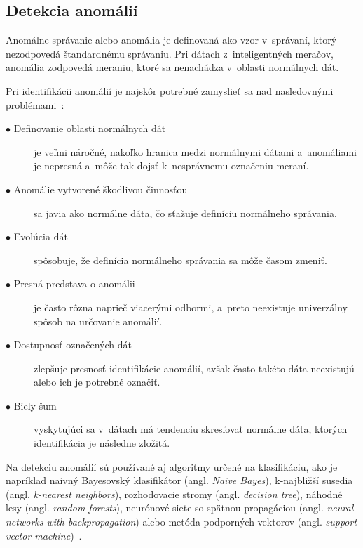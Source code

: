 \documentclass[a4paper,twoside,slovak,12pt,appendix]{article}
\begin{document}

\subsection{Detekcia anomálií}
Anomálne správanie alebo anomália je definovaná ako vzor v~správaní, ktorý
nezodpovedá štandardnému správaniu. Pri dátach z~inteligentných meračov,
anomália zodpovedá meraniu, ktoré sa nenachádza v~oblasti normálnych dát.

Pri identifikácii anomálií je najskôr potrebné zamyslieť sa nad nasledovnými
problémami~\cite{Chandola2009}:
\begin{description}
	\item[$\bullet$ Definovanie oblasti normálnych dát] je veľmi náročné, nakoľko
	hranica medzi normálnymi dátami a~anomáliami je nepresná a~môže tak dojsť
	k~nesprávnemu označeniu meraní.
	\item[$\bullet$ Anomálie vytvorené škodlivou činnosťou] sa javia ako normálne
	dáta, čo sťažuje definíciu normálneho správania.
	\item[$\bullet$ Evolúcia dát] spôsobuje, že definícia normálneho správania sa
	môže časom zmeniť.
	\item[$\bullet$ Presná predstava o anomálii] je často rôzna naprieč viacerými
	odbormi, a~preto neexistuje univerzálny spôsob na určovanie anomálií.
	\item[$\bullet$ Dostupnosť označených dát] zlepšuje presnosť identifikácie
	anomálií, avšak často takéto dáta neexistujú alebo ich je potrebné označiť.
	\item[$\bullet$ Biely šum] vyskytujúci sa v~dátach má tendenciu skresľovať
	normálne dáta, ktorých identifikácia je následne zložitá.
\end{description}

Na detekciu anomálií sú používané aj algoritmy určené na klasifikáciu, ako je
napríklad naivný Bayesovský klasifikátor (angl. \textit{Naive Bayes}),
k-najbližší susedia (angl. \textit{k-nearest neighbors}), rozhodovacie stromy
(angl. \textit{decision tree}), náhodné lesy (angl. \textit{random forests}),
neurónové siete so spätnou propagáciou (angl. \textit{neural networks with
backpropagation}) alebo metóda podporných vektorov (angl. \textit{support vector
machine})~\cite{Coma-Puig2016}.

\end{document}
